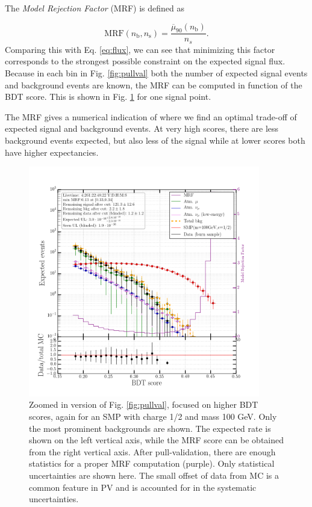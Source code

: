\noindent The \textit{Model Rejection Factor} (MRF) is defined as 

\begin{equation}
\textrm{MRF}\left(n_\textrm{b}, n_\textrm{s}\right) =  \frac{\overline{\mu}_{90}\left(n_\textrm{b}\right)}{n_s}.
\end{equation}
\noindent Comparing this with Eq. \ref{eq:flux}, we can see that minimizing this factor corresponds to the strongest possible constraint on the expected signal flux. Because in each bin in Fig. \ref{fig:pullval} both the number of expected signal events and background events are known, the MRF can be computed in function of the BDT score. This is shown in Fig. \ref{fig:mrf} for one signal point.

The MRF gives a numerical indication of where we find an optimal trade-off of expected signal and background events. At very high scores, there are less background events expected, but also less of the signal while at lower scores both have higher expectancies.\\

\begin{figure}
\centering
\includegraphics[width=0.9\textwidth]{chapter8/img/ModelRejectionFactor_percentile_0p9_signal_m_100_ch_1ovr2_noSYST.png}
\caption{Zoomed in version of Fig. \ref{fig:pullval}, focused on higher BDT scores, again for an SMP with charge 1/2 and mass 100 GeV. Only the most prominent backgrounds are shown. The expected rate is shown on the left vertical axis, while the MRF score can be obtained from the right vertical axis. After pull-validation, there are enough statistics for a proper MRF computation (purple). Only statistical uncertainties are shown here. The small offset of data from MC is a common feature in PV and is accounted for in the systematic uncertainties.}
\label{fig:mrf}
\end{figure}

